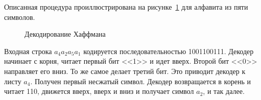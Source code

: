Описанная процедура проиллюстрирована на рисунке~\ref{pic:huffman_de}
для алфавита из пяти символов. 

\begin{figure}[h]
  \centering
  {
    \setlength{\fboxsep}{0pt}%
    \setlength{\fboxrule}{1pt}%
  }
  \caption{Декодирование Хаффмана}
  \label{pic:huffman_de}
\end{figure}

Входная строка $a_4a_2a_5a_1$ кодируется
последовательностью 1001100111. Декодер начинает с корня, читает первый
бит <<1>> и идет вверх. Второй бит <<0>> направляет его вниз. 
То же самое делает третий бит. Это приводит декодер к листу $a_4$.
Получен первый несжатый символ. Декодер возвращается в корень и читает
110, движется вверх, вверх и вниз и получает символ $a_2$, и так далее.